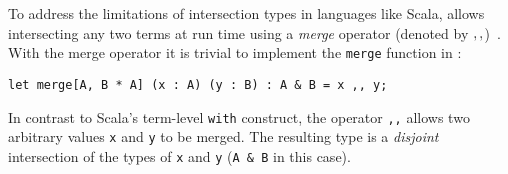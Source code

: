 To address the limitations of intersection types in languages like
Scala, \name allows intersecting any two terms at run time using a
\emph{merge} operator (denoted by $ ,, $)~\cite{dunfield2014elaborating}.  With the merge
operator it is trivial to implement the \lstinline{merge} function in \name:

\begin{lstlisting}
let merge[A, B * A] (x : A) (y : B) : A & B = x ,, y;
\end{lstlisting}

\noindent In contrast to Scala's term-level \lstinline{with}
construct, the operator \lstinline{,,} allows two arbitrary values \lstinline{x}
and \lstinline{y} to be merged. The resulting type is a \emph{disjoint}
intersection of the types of  \lstinline{x}
and \lstinline{y} (\lstinline{A & B} in this case).

\begin{comment}
The following table
summarizes the extent of support for intersection types in Java,
Scala, and \name.

\hspace{-13pt}\begin{tabular}{ l | c | c | c  }
                                   & Java       & Scala      & \name      \\ \hline
  Basic intersection types         & \checkmark & \checkmark & \checkmark \\ \hline
  Anonymous intersection types     &            & \checkmark & \checkmark \\ \hline
  Intersection of type parameters  &            & \checkmark & \checkmark \\ \hline
  Term-level intersection          &            &            & \checkmark
\end{tabular} \\
\end{comment}

